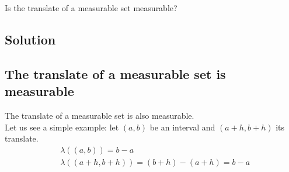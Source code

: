 

\question
Is the translate of a measurable set measurable?

\subsection*{Solution}

\subsection{The translate of a measurable set is measurable}
The translate of a measurable set is also measurable. \\
Let us see a simple example: let $(a,b)$ be an interval and $(a+h,b+h)$ its translate.
\begin{align*}
     & \lambda((a,b)) = b-a                   \\
     & \lambda((a+h,b+h)) = (b+h)-(a+h) = b-a
\end{align*}